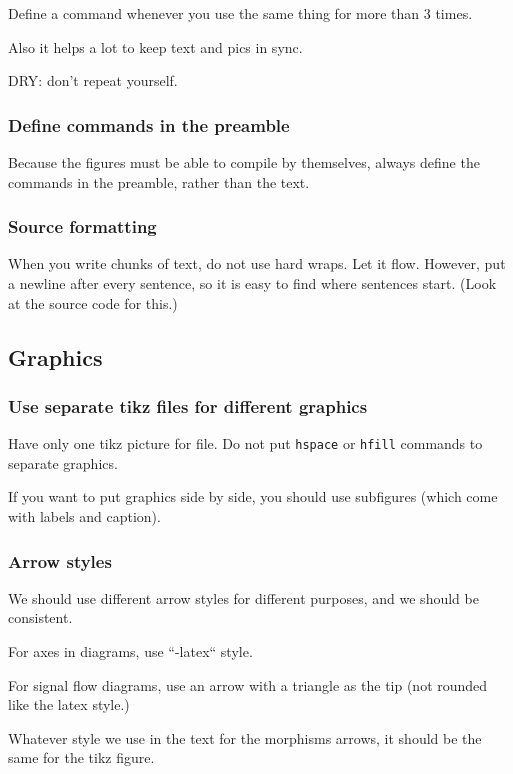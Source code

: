 Define a command whenever you use the same thing for more than 3 times.

Also it helps a lot to keep text and pics in sync.

DRY: don't repeat yourself.



\subsubsection*{Define commands in the preamble }

Because the figures must be able to compile by themselves, always define the commands in the preamble, rather than the text.



\subsubsection*{Source formatting}

When you write chunks of text, do not use hard wraps. %
Let it flow. %
However, put a newline after every sentence, so it is easy to find where sentences start.
(Look at the source code for this.)


\subsection*{Graphics}

\subsubsection*{Use separate tikz files for different graphics}

Have only one tikz picture for file. Do not put \texttt{hspace} or \texttt{hfill} commands to separate graphics.


If you want to put graphics side by side, you should use subfigures (which come with labels and caption).


\subsubsection*{Arrow styles}

We should use different arrow styles for different purposes,
and we should be consistent.

For axes in diagrams, use ``-latex`` style.

For signal flow diagrams, use an arrow with a triangle as the tip (not rounded like the latex style.)

Whatever style we use in the text for the morphisms arrows, it should be the
same for the tikz figure.







